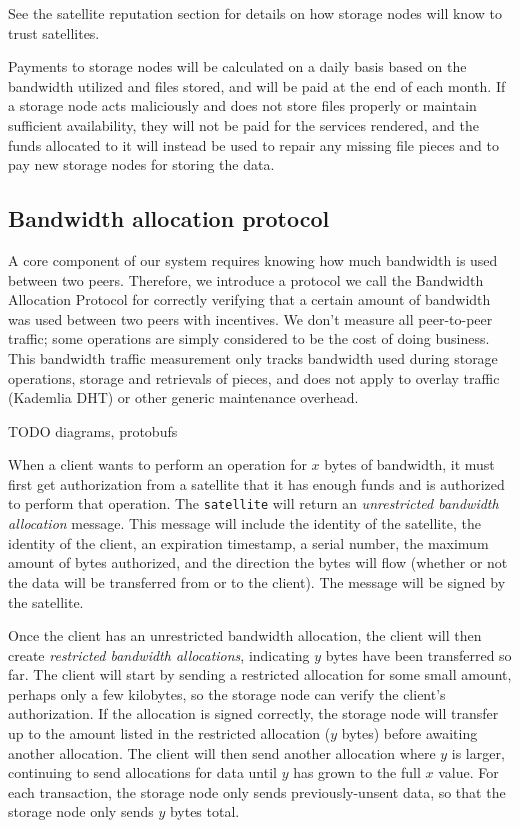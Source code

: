 \documentclass[11pt,fleqn,openany]{book}
\newcommand{\x}[1]{{\tt #1}} \newcommand{\code}[1]{{\em #1}}
\newcommand{\todo}[1]{{\color{red} TODO #1 }}
\begin{document}
See the satellite reputation section for details on
how storage nodes will know to trust satellites.

Payments to storage nodes will be calculated on a daily basis based on the
bandwidth
utilized and files stored, and will be paid at the end of each month.
If a storage node acts
maliciously and does not store files properly or maintain sufficient
availability, they will not be paid for the services rendered, and the funds
allocated to it will instead be used to repair any missing
file pieces and to pay new storage nodes for storing the data.

\subsection{Bandwidth allocation protocol}\label{bap}

A core component of our system requires knowing how much bandwidth is used
between two peers. Therefore, we introduce a protocol we call the Bandwidth Allocation
Protocol for correctly verifying that a certain amount of bandwidth was used
between two peers with incentives.
We don't measure all peer-to-peer traffic;
some operations are simply considered to be
the cost of doing business. This bandwidth traffic measurement only tracks
bandwidth used during storage operations, storage and retrievals of pieces,
and does not apply to overlay traffic (Kademlia DHT) or other generic
maintenance overhead.

\todo{diagrams, protobufs}

When a client wants to perform an operation for $x$ bytes of bandwidth, it must
first get authorization from a satellite
that it has enough funds and is authorized to perform that operation.
The \x{satellite} will return an {\em unrestricted
bandwidth allocation} message. This message will include the identity of the
satellite, the identity of the client, an expiration timestamp, a serial number,
the maximum amount of bytes authorized, and the direction the bytes will flow
(whether or not the data will be transferred from or to the client).
The message will be signed by the satellite.


Once the client has an unrestricted bandwidth allocation, the client will then
create {\em restricted bandwidth allocations},
indicating $y$ bytes have been transferred so far. The client
will start by sending a restricted allocation for some small amount,
perhaps only a few kilobytes,
so the storage node can verify the client's authorization.
If the allocation is signed correctly, the storage node will
transfer up to the amount listed in the restricted allocation ($y$ bytes) before
awaiting another allocation. The client will then send another allocation where
$y$ is larger, continuing to send allocations for data until $y$ has grown to
the full $x$ value.
For each transaction, the storage node only sends previously-unsent data,
so that the storage node only sends $y$ bytes total.
\end{document}
